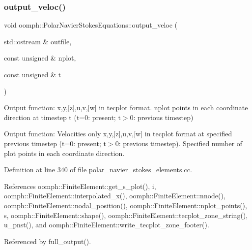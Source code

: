 \mbox{\label{classoomph_1_1PolarNavierStokesEquations_a960e2b96a00d4f29f91aeef9dafb1bdb}} 
\subsubsection{\texorpdfstring{output\+\_\+veloc()}{output\_veloc()}}
{\footnotesize\ttfamily void oomph\+::\+Polar\+Navier\+Stokes\+Equations\+::output\+\_\+veloc (\begin{DoxyParamCaption}\item[{std\+::ostream \&}]{outfile,  }\item[{const unsigned \&}]{nplot,  }\item[{const unsigned \&}]{t }\end{DoxyParamCaption})}



Output function\+: x,y,\mbox{[}z\mbox{]},u,v,\mbox{[}w\mbox{]} in tecplot format. nplot points in each coordinate direction at timestep t (t=0\+: present; t$>$0\+: previous timestep) 

Output function\+: Velocities only x,y,\mbox{[}z\mbox{]},u,v,\mbox{[}w\mbox{]} in tecplot format at specified previous timestep (t=0\+: present; t$>$0\+: previous timestep). Specified number of plot points in each coordinate direction. 

Definition at line 340 of file polar\+\_\+navier\+\_\+stokes\+\_\+elements.\+cc.



References oomph\+::\+Finite\+Element\+::get\+\_\+s\+\_\+plot(), i, oomph\+::\+Finite\+Element\+::interpolated\+\_\+x(), oomph\+::\+Finite\+Element\+::nnode(), oomph\+::\+Finite\+Element\+::nodal\+\_\+position(), oomph\+::\+Finite\+Element\+::nplot\+\_\+points(), s, oomph\+::\+Finite\+Element\+::shape(), oomph\+::\+Finite\+Element\+::tecplot\+\_\+zone\+\_\+string(), u\+\_\+pnst(), and oomph\+::\+Finite\+Element\+::write\+\_\+tecplot\+\_\+zone\+\_\+footer().



Referenced by full\+\_\+output().

\mbox{\label{classoomph_1_1PolarNavierStokesEquations_a4738c2cb0df9ba80c581442ceade039e}} 
